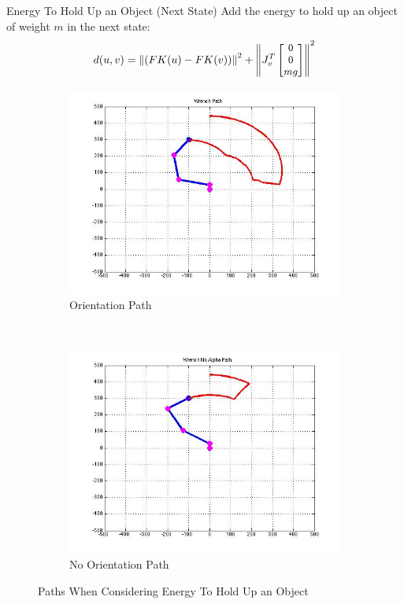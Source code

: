 \documentclass{beamer}
\newcommand{\bM}{\begin{bmatrix}}
\newcommand{\eM}{\end{bmatrix}}
\begin{document}
\begin{frame}{Energy To Hold Up an Object (Next State)}
Add the energy to hold up an object of weight $m$ in the next state:\\ 
$$	d(u,v) =  \left\|(FK(u)-FK(v))\right\|^2 + \small\left\|J^T_v\bM 0 \\ 0 \\ mg \eM\right\|^2$$\normalsize
\begin{figure}[htb]
\centering
\begin{subfigure}[b]{0.5\textwidth}
\centering
\includegraphics[scale=.2]{PathPics/Wrench_Path.jpg}
\caption{Orientation Path}
\end{subfigure}%
~ 
\begin{subfigure}[b]{0.5\textwidth}
\centering
\includegraphics[scale=.2]{PathPics/Wrench_NoAlpha_Path.jpg}
\caption{No Orientation Path}
\end{subfigure}

\caption{Paths When Considering Energy To Hold Up an Object}
\label{fig:EnergyPaths1}
\end{figure}
\end{frame}
\end{document}
